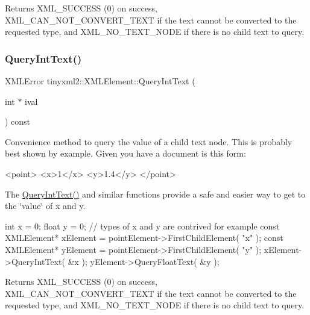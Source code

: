 \begin{DoxyReturn}{Returns}
X\+M\+L\+\_\+\+S\+U\+C\+C\+E\+SS (0) on success, X\+M\+L\+\_\+\+C\+A\+N\+\_\+\+N\+O\+T\+\_\+\+C\+O\+N\+V\+E\+R\+T\+\_\+\+T\+E\+XT if the text cannot be converted to the requested type, and X\+M\+L\+\_\+\+N\+O\+\_\+\+T\+E\+X\+T\+\_\+\+N\+O\+DE if there is no child text to query. 
\end{DoxyReturn}
\mbox{\label{classtinyxml2_1_1XMLElement_a926357996bef633cb736e1a558419632}} 
\subsubsection{\texorpdfstring{Query\+Int\+Text()}{QueryIntText()}\hspace{0.1cm}{\footnotesize\ttfamily [2/2]}}
{\footnotesize\ttfamily X\+M\+L\+Error tinyxml2\+::\+X\+M\+L\+Element\+::\+Query\+Int\+Text (\begin{DoxyParamCaption}\item[{int $\ast$}]{ival }\end{DoxyParamCaption}) const}

Convenience method to query the value of a child text node. This is probably best shown by example. Given you have a document is this form\+: \begin{DoxyVerb}    <point>
        <x>1</x>
        <y>1.4</y>
    </point>
\end{DoxyVerb}


The \hyperlink{classtinyxml2_1_1XMLElement_a926357996bef633cb736e1a558419632}{Query\+Int\+Text()} and similar functions provide a safe and easier way to get to the \char`\"{}value\char`\"{} of x and y.

\begin{DoxyVerb}    int x = 0;
    float y = 0;    // types of x and y are contrived for example
    const XMLElement* xElement = pointElement->FirstChildElement( "x" );
    const XMLElement* yElement = pointElement->FirstChildElement( "y" );
    xElement->QueryIntText( &x );
    yElement->QueryFloatText( &y );
\end{DoxyVerb}


\begin{DoxyReturn}{Returns}
X\+M\+L\+\_\+\+S\+U\+C\+C\+E\+SS (0) on success, X\+M\+L\+\_\+\+C\+A\+N\+\_\+\+N\+O\+T\+\_\+\+C\+O\+N\+V\+E\+R\+T\+\_\+\+T\+E\+XT if the text cannot be converted to the requested type, and X\+M\+L\+\_\+\+N\+O\+\_\+\+T\+E\+X\+T\+\_\+\+N\+O\+DE if there is no child text to query. 
\end{DoxyReturn}
\mbox{\label{classtinyxml2_1_1XMLElement_aafa2807a45b28fe096b29d76e6a13b7c}} 
